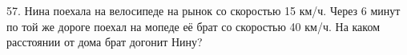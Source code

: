 57. Нина поехала на велосипеде на рынок со скоростью 15 км/ч. Через 6 минут по той же дороге поехал на мопеде её брат со скоростью 40 км/ч. На каком расстоянии от дома брат догонит Нину?\\
